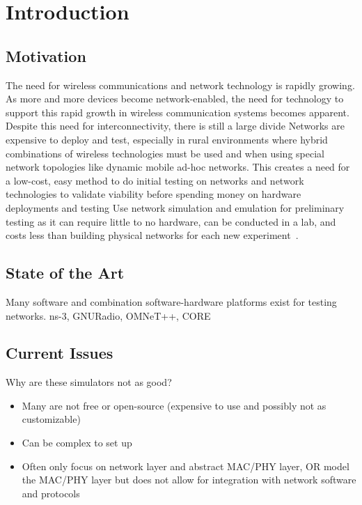 \chapter{Introduction}
\label{ch:introduction}
\section{Motivation}
The need for wireless communications and network technology is rapidly growing.
As more and more devices become network-enabled, the need for technology to support this rapid growth in wireless communication systems becomes apparent.
Despite this need for interconnectivity, there is still a large divide 
Networks are expensive to deploy and test, especially in rural environments where hybrid combinations of wireless technologies must be used and when using special network topologies like dynamic mobile ad-hoc networks.
This creates a need for a low-cost, easy method to do initial testing on networks and network technologies to validate viability before spending money on hardware deployments and testing
Use network simulation and emulation for preliminary testing as it can require little to no hardware, can be conducted in a lab, and costs less than building physical networks for each new experiment~\cite{broadband_factsheet, digital_divide, iot_spread}.

\section{State of the Art}
Many software and combination software-hardware platforms exist for testing networks.
ns-3, GNURadio, OMNeT++, CORE


\section{Current Issues}
Why are these simulators not as good?
\begin{itemize}
    \item Many are not free or open-source (expensive to use and possibly not as customizable) %
    \item Can be complex to set up %
    \item Often only focus on network layer and abstract MAC/PHY layer, OR model the MAC/PHY layer but does not allow for integration with network software and protocols %
\end{itemize}


